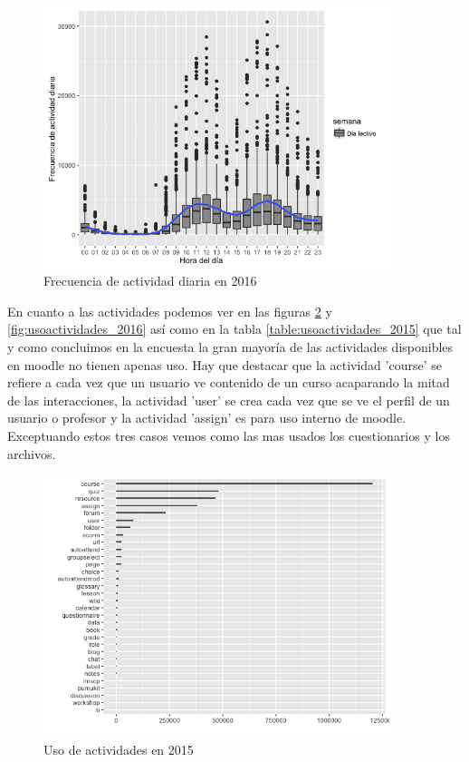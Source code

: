 \begin{figure}[H]
\centering
\includegraphics[width=0.9\textwidth]{../r/frecuenciaactividaddiaria_2016}
\caption{Frecuencia de actividad diaria en 2016}
\label{fig:frecuenciaactividaddiaria_2016}
\end{figure}


En cuanto a las actividades podemos ver en las figuras \ref{fig:usoactividades_2015} y \ref{fig:usoactividades_2016} así como en la tabla \ref{table:usoactividades_2015} que tal y como concluimos en la encuesta la gran mayoría de las actividades disponibles en moodle no tienen apenas uso. Hay que destacar que la actividad 'course' se refiere a cada vez que un usuario ve contenido de un curso acaparando la mitad de las interacciones, la actividad 'user' se crea cada vez que se ve el perfil de un usuario o profesor y la actividad 'assign' es para uso interno de moodle. Exceptuando estos tres casos vemos como las mas usados los cuestionarios y los archivos.

\begin{figure}[H]
\centering
\includegraphics[width=0.9\textwidth]{../r/usoactividades_2015}
\caption{Uso de actividades en 2015}
\label{fig:usoactividades_2015}
\end{figure}

